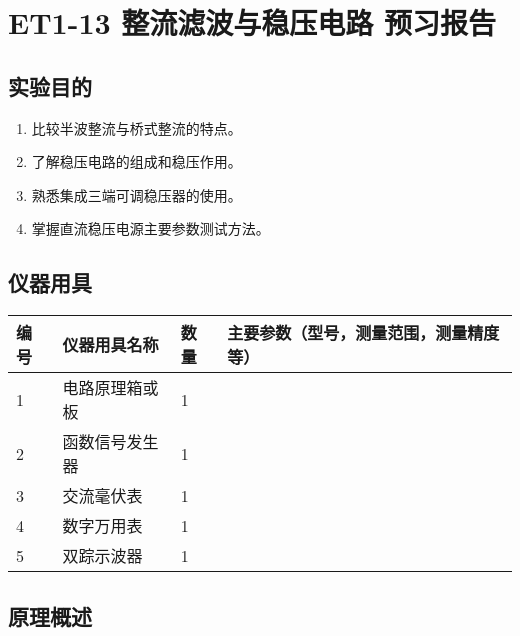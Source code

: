 \documentclass[dvipsnames, svgnames,a4paper,11pt]{article}
\begin{document}
	
	
	\clearpage
	\tableofcontents
	\clearpage
	
	
	
	
	\setcounter{section}{0}
	\section{ET1-13 整流滤波与稳压电路 \quad\heiti 预习报告}
	
	\subsection{实验目的}
	\begin{enumerate}
		\item 比较半波整流与桥式整流的特点。
		\item 了解稳压电路的组成和稳压作用。
		\item 熟悉集成三端可调稳压器的使用。
		\item 掌握直流稳压电源主要参数测试方法。 		
	\end{enumerate}
	

	
	\subsection{仪器用具}
	\begin{table}[htbp]
		\centering
		\renewcommand\arraystretch{1.6}
		\begin{tabular}{p{}|p{}|p{}|p{}}
			\hline
			编号& 仪器用具名称 & 数量 &  主要参数（型号，测量范围，测量精度等） \\
			\hline
			1&  电路原理箱或板& 1 &  \\
			\hline
			2&  函数信号发生器& 1 &  \\
			\hline
			3&  交流毫伏表& 1 &  \\
			\hline
			4&  数字万用表& 1 &  \\
			\hline
			5&  双踪示波器& 1 &  \\
			\hline
		\end{tabular}
	\end{table}
	
	\subsection{原理概述}
\end{document}
